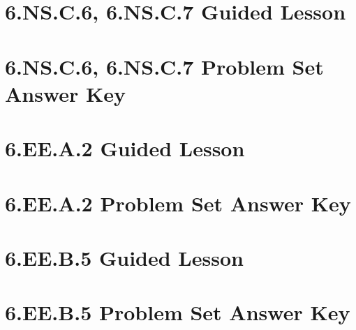\documentclass[a4paper,12pt]{article}
\begin{document}
\newpage
\section{6.NS.C.6, 6.NS.C.7 Guided Lesson}


\newpage
\section{6.NS.C.6, 6.NS.C.7 Problem Set Answer Key}


\newpage
\section{6.EE.A.2 Guided Lesson}


\newpage
\section{6.EE.A.2 Problem Set Answer Key}


\newpage
\section{6.EE.B.5 Guided Lesson}


\newpage
\section{6.EE.B.5 Problem Set Answer Key}

\end{document}
